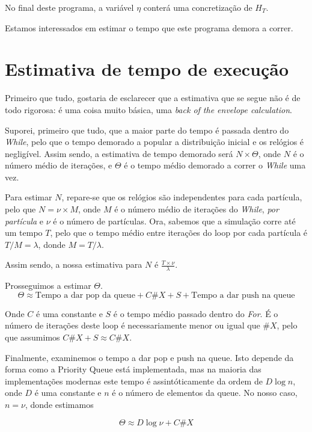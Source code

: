 \documentclass{article}
\begin{document}
	\bigskip
	
	No final deste programa, a variável $\eta$ conterá uma concretização de $H_T$.
	
	Estamos interessados em estimar o tempo que este programa demora a correr.
	
	
	\section{Estimativa de tempo de execução}
	
	Primeiro que tudo, gostaria de esclarecer que a estimativa que se segue não é de todo rigorosa: é uma coisa muito básica, uma \emph{back of the envelope calculation}.
	
	Suporei, primeiro que tudo, que a maior parte do tempo é passada dentro do \emph{While}, pelo que o tempo demorado a popular a distribuição inicial e os relógios é negligível. Assim sendo, a estimativa de tempo demorado será $N \times \Theta$, onde $N$ é o número médio de iterações, e $\Theta$ é o tempo médio demorado a correr o \emph{While} uma vez.
	
	Para estimar $N$, repare-se que os relógios são independentes para cada partícula, pelo que $N = \nu \times M$, onde $M$ é o número médio de iterações do \emph{While}, \emph{por partícula} e $\nu$ é o número de partículas. Ora, sabemos que a simulação corre até um tempo $T$, pelo que o tempo médio entre iterações do loop por cada partícula é $T/M = \lambda$, donde $M = T/\lambda$.
	
	Assim sendo, a nossa estimativa para $N$ é $\frac{T \times \nu}\lambda$.
	
	Prosseguimos a estimar $\Theta$.
	\[\Theta \approx \text{Tempo a dar pop da queue} + C \#X + S + \text{Tempo a dar push na queue}\]
	
	Onde $C$ é uma constante e $S$ é o tempo médio passado dentro do \emph{For}. É o número de iterações deste loop é necessariamente menor ou igual que $\#X$, pelo que assumimos $C \#X + S \approx C \#X$.
	
	Finalmente, examinemos o tempo a dar pop e push na queue. Isto depende da forma como a Priority Queue está implementada, mas na maioria das implementações modernas este tempo é assintóticamente da ordem de $D \log n$, onde $D$ é uma constante e $n$ é o número de elementos da queue. No nosso caso, $n = \nu$, donde estimamos
	
	\[\Theta \approx D \log \nu + C \#X\]
	
\end{document}
